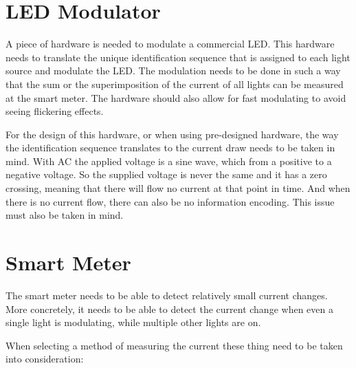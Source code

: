 	\section{LED Modulator}

	A piece of hardware is needed to modulate a commercial LED.
	This hardware needs to translate the unique identification sequence that is assigned to each light source and modulate the LED.
	The modulation needs to be done in such a way that the sum or the superimposition of the current of all lights can be measured at the smart meter.  
	The hardware should also allow for fast modulating to avoid seeing flickering effects.


	For the design of this hardware, or when using pre-designed hardware, the way the identification sequence translates to the current draw needs to be taken in mind. 
	With AC the applied voltage is a sine wave, which from a positive to a negative voltage.
	So the supplied voltage is never the same and it has a zero crossing, meaning that there will flow no current at that point in time.
	And when there is no current flow, there can also be no information encoding.
	This issue must also be taken in mind.



	\section{Smart Meter}

	The smart meter needs to be able to detect relatively small current changes.
	More concretely, it needs to be able to detect the current change when even a single light is modulating, while multiple other lights are on.

	When selecting a method of measuring the current these thing need to be taken into consideration:

